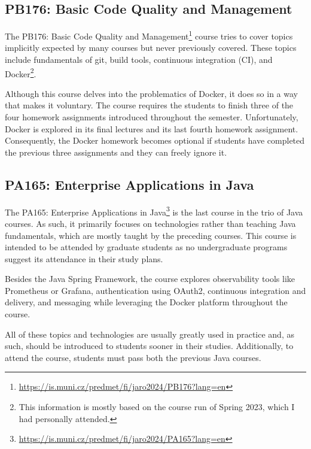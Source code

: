 \documentclass[
  digital,
  color,
  oneside,
  nosansbold,
  nocolorbold,
  nolof,
  nolot,
]{fithesis4}
\begin{document}
\subsection{PB176: Basic Code Quality and Management}\label{code-quality-and-management}

The PB176: Basic Code Quality and Management\footnote{\url{https://is.muni.cz/predmet/fi/jaro2024/PB176?lang=en}} course tries to cover topics implicitly expected by many courses but never previously covered. These topics include fundamentals of git, build tools, continuous integration (CI), and Docker\footnote{This information is mostly based on the course run of Spring 2023, which I had personally attended.}. 

Although this course delves into the problematics of Docker, it does so in a way that makes it voluntary. The course requires the students to finish three of the four homework assignments introduced throughout the semester. Unfortunately, Docker is explored in its final lectures and its last fourth homework assignment. Consequently, the Docker homework becomes optional if students have completed the previous three assignments and they can freely ignore it.

\subsection{PA165: Enterprise Applications in Java}\label{enterprise-java-course}

The PA165: Enterprise Applications in Java\footnote{\url{https://is.muni.cz/predmet/fi/jaro2024/PA165?lang=en}} is the last course in the trio of Java courses. As such, it primarily focuses on technologies rather than teaching Java fundamentals, which are mostly taught by the preceding courses. This course is intended to be attended by graduate students as no undergraduate programs suggest its attendance in their study plans.

Besides the Java Spring Framework\cite{spring}, the course explores observability tools like Prometheus\cite{prometheus} or Grafana\cite{grafana}, authentication using OAuth2\cite{oauth2}, continuous integration and delivery, and messaging while leveraging the Docker platform throughout the course.

All of these topics and technologies are usually greatly used in practice and, as such, should be introduced to students sooner in their studies. Additionally, to attend the course, students must pass both the previous Java courses.
\end{document}
